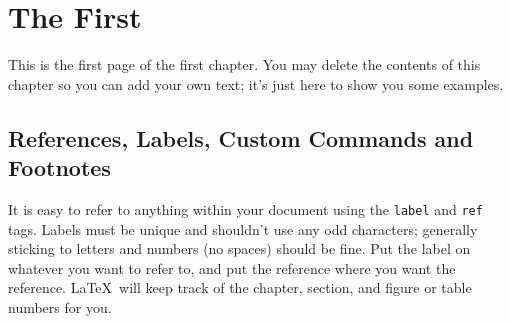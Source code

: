 \documentclass[12pt,twoside]{reedthesis}
\theoremstyle{plain}   %
\theoremstyle{definition}
\theoremstyle{remark}
\numberwithin{equation}{section}
\begin{document}
   









































































        
    \chapter{The First}
    	This is the first page of the first chapter. You may delete the contents of this chapter so you can add your own text; it's just here to show you some examples. 
	
\section{References, Labels, Custom Commands and Footnotes}
It is easy to refer to anything within your document using the \texttt{label} and \texttt{ref} tags.  Labels must be unique and shouldn't use any odd characters; generally sticking to letters and numbers (no spaces) should be fine. Put the label on whatever you want to refer to, and put the reference where you want the reference. \LaTeX\ will keep track of the chapter, section, and figure or table numbers for you. 
\end{document}
